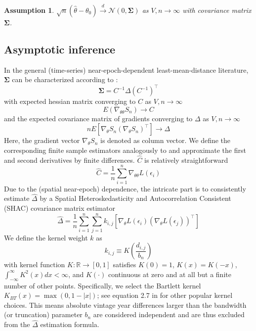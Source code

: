 \documentclass[12pt]{article}
\newtheorem{assume}{Assumption}
\begin{document}
\begin{assume}
	$\sqrt{n}(\hat{\theta} - \theta_0) \overset{d}{\to} \mathcal{N}(0,\mathbf{\Sigma})$ as $V,n \to \infty$ with covariance matrix $\mathbf{\Sigma}$.
\end{assume}

\subsection{Asymptotic inference}

In the general (time-series) near-epoch-dependent least-mean-distance literature, $\mathbf{\Sigma}$ can be characterized according to \citet[Theorem 11.2.b, Theorem H.1]{PP97}:
\[
\mathbf{\Sigma} = C^{-1} \Delta (C^{-1})^\top
\]
with expected hessian matrix converging to $C$ as $V,n \to \infty$
\[
E 
\left(
\nabla_{\theta \theta} S_n
\right)
\to C
\]
and the expected covariance matrix of gradients converging to $\Delta$ as $V,n \to \infty$
\[
n E 
\left[
\nabla_{\theta} S_n
(\nabla_{\theta} S_n)^\top
\right]
\to \Delta
\]
Here, the gradient vector $\nabla_{\theta} S_n$ is denoted as column vector.
We define the corresponding finite sample estimators analogously to \citet[Chapters 12, 13.1]{PP97} and approximate the first and second derivatives by finite differences. $\hat{C}$ is relatively straightforward
\[
\hat{C} = \frac{1}{n} \sum_{i=1}^n \nabla_{\theta \theta} L \left( \epsilon_i \right)
\]
Due to the (spatial near-epoch) dependence, the intricate part is to consistently estimate $\hat{\Delta}$ by a Spatial Heteroskedasticity and Autocorrelation Consistent (SHAC) covariance matrix estimator \cite[equation 2]{KS11}
\[
\hat{\Delta} = \frac{1}{n} \sum_{i=1}^n \sum_{j=1}^n
k_{i,j}
\left[
\nabla_{\theta} L \left( \epsilon_i \right)
\left(
\nabla_{\theta} L \left( \epsilon_j \right)
\right)^\top
\right]
\]
We define the kernel weight $k$ as
\[
k_{i,j} \equiv K \left( \frac{d_{i,j}}{b_n} \right)
\]
with kernel function $K: \mathbb{R} \to [0,1]$ satisfies $K(0)=1$, $K(x)=K(-x)$, $\int_{-\infty}^{\infty} K^2(x) dx < \infty$, and $K(\cdot)$ continuous at zero and at all but a finite number of other points.
Specifically, we select the Bartlett kernel $K_{BT}(x)= \max(0, 1-|x|)$; see equation 2.7 in \cite{A91} for other popular kernel choices.
This means absolute vintage year differences larger than the bandwidth (or truncation) parameter $b_n$ are considered independent and are thus excluded from the $\hat{\Delta}$ estimation formula.
\end{document}
